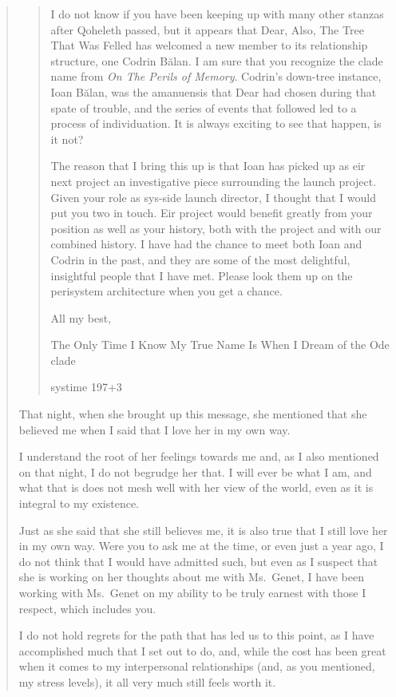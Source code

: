 \begin{quote}
\begin{quote}
I do not know if you have been keeping up with many other stanzas after Qoheleth passed, but it appears that Dear, Also, The Tree That Was Felled has welcomed a new member to its relationship structure, one Codrin Bălan. I am sure that you recognize the clade name from \emph{On The Perils of Memory}. Codrin's down-tree instance, Ioan Bălan, was the amanuensis that Dear had chosen during that spate of trouble, and the series of events that followed led to a process of individuation. It is always exciting to see that happen, is it not?

The reason that I bring this up is that Ioan has picked up as eir next project an investigative piece surrounding the launch project. Given your role as sys-side launch director, I thought that I would put you two in touch. Eir project would benefit greatly from your position as well as your history, both with the project and with our combined history. I have had the chance to meet both Ioan and Codrin in the past, and they are some of the most delightful, insightful people that I have met. Please look them up on the perisystem architecture when you get a chance.

All my best,

The Only Time I Know My True Name Is When I Dream of the Ode clade

systime 197+3
\end{quote}

That night, when she brought up this message, she mentioned that she believed me when I said that I love her in my own way.

I understand the root of her feelings towards me and, as I also mentioned on that night, I do not begrudge her that. I will ever be what I am, and what that is does not mesh well with her view of the world, even as it is integral to my existence.

Just as she said that she still believes me, it is also true that I still love her in my own way. Were you to ask me at the time, or even just a year ago, I do not think that I would have admitted such, but even as I suspect that she is working on her thoughts about me with Ms.~Genet, I have been working with Ms.~Genet on my ability to be truly earnest with those I respect, which includes you.

I do not hold regrets for the path that has led us to this point, as I have accomplished much that I set out to do, and, while the cost has been great when it comes to my interpersonal relationships (and, as you mentioned, my stress levels), it all very much still feels worth it.


\end{quote}
